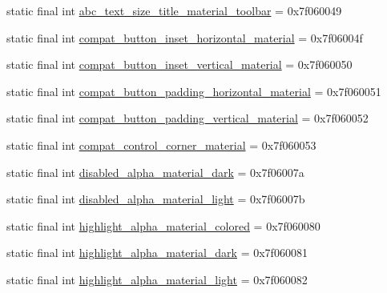 \begin{DoxyCompactItemize}
\item 
static final int \mbox{\hyperlink{classandroid_1_1support_1_1v7_1_1appcompat_1_1R_1_1dimen_af12b0fa15cc97e0cad7d4b0bebdd7aae}{abc\+\_\+text\+\_\+size\+\_\+title\+\_\+material\+\_\+toolbar}} = 0x7f060049
\item 
static final int \mbox{\hyperlink{classandroid_1_1support_1_1v7_1_1appcompat_1_1R_1_1dimen_a925336facca4d95d251d9a864d8ad311}{compat\+\_\+button\+\_\+inset\+\_\+horizontal\+\_\+material}} = 0x7f06004f
\item 
static final int \mbox{\hyperlink{classandroid_1_1support_1_1v7_1_1appcompat_1_1R_1_1dimen_a2cf6a9d975611169adedca0817af556d}{compat\+\_\+button\+\_\+inset\+\_\+vertical\+\_\+material}} = 0x7f060050
\item 
static final int \mbox{\hyperlink{classandroid_1_1support_1_1v7_1_1appcompat_1_1R_1_1dimen_a99f8d7484ffb2ede9696546e5d4d751c}{compat\+\_\+button\+\_\+padding\+\_\+horizontal\+\_\+material}} = 0x7f060051
\item 
static final int \mbox{\hyperlink{classandroid_1_1support_1_1v7_1_1appcompat_1_1R_1_1dimen_a45a5bf520824d04a23fbc20030a919bd}{compat\+\_\+button\+\_\+padding\+\_\+vertical\+\_\+material}} = 0x7f060052
\item 
static final int \mbox{\hyperlink{classandroid_1_1support_1_1v7_1_1appcompat_1_1R_1_1dimen_a6183edfb5a94602dea84f1afc3651b1b}{compat\+\_\+control\+\_\+corner\+\_\+material}} = 0x7f060053
\item 
static final int \mbox{\hyperlink{classandroid_1_1support_1_1v7_1_1appcompat_1_1R_1_1dimen_a78e3c6694aea37232a590b844f17b580}{disabled\+\_\+alpha\+\_\+material\+\_\+dark}} = 0x7f06007a
\item 
static final int \mbox{\hyperlink{classandroid_1_1support_1_1v7_1_1appcompat_1_1R_1_1dimen_a1f1e081830c0d783ecaf9cfee0b9eeb9}{disabled\+\_\+alpha\+\_\+material\+\_\+light}} = 0x7f06007b
\item 
static final int \mbox{\hyperlink{classandroid_1_1support_1_1v7_1_1appcompat_1_1R_1_1dimen_a468abd7365c28db4fd309195f88935ef}{highlight\+\_\+alpha\+\_\+material\+\_\+colored}} = 0x7f060080
\item 
static final int \mbox{\hyperlink{classandroid_1_1support_1_1v7_1_1appcompat_1_1R_1_1dimen_ad93b99bbf97705e8323ca28d22e5b55f}{highlight\+\_\+alpha\+\_\+material\+\_\+dark}} = 0x7f060081
\item 
static final int \mbox{\hyperlink{classandroid_1_1support_1_1v7_1_1appcompat_1_1R_1_1dimen_a86a754bbbd93cc196da3b0b984a92c32}{highlight\+\_\+alpha\+\_\+material\+\_\+light}} = 0x7f060082

\end{DoxyCompactItemize}
